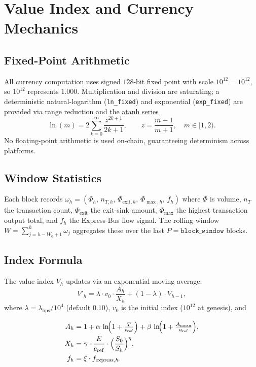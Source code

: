 \documentclass[11pt,a4paper]{article}
\theoremstyle{definition}
\newcommand{\FP}{10^{12}}
\newcommand{\bps}{\mathrm{bps}}
\begin{document}
\section{Value Index and Currency Mechanics}
\label{sec:value-index}

\subsection{Fixed-Point Arithmetic}

All currency computation uses signed $128$-bit fixed point with scale
$\FP = 10^{12}$, so $\FP$ represents $1.000$.  Multiplication and division are
saturating; a deterministic natural-logarithm (\texttt{ln\_fixed}) and
exponential (\texttt{exp\_fixed}) are provided via range reduction and the
\href{https://en.wikipedia.org/wiki/Rapidly_convergent_statements_for_ln}{atanh series}
\[
\ln(m) = 2\sum_{k=0}^{\infty} \frac{z^{2k+1}}{2k+1},\qquad z=\frac{m-1}{m+1},\quad m\in[1,2).
\]
No floating-point arithmetic is used on-chain, guaranteeing determinism across
platforms.

\subsection{Window Statistics}

Each block records $\omega_h = (\Phi_h,\, n_{T,h},\, \Phi_{\mathrm{exit},h},\,
\Phi_{\max,h},\, f_h)$ where $\Phi$ is volume, $n_T$ the transaction count,
$\Phi_{\mathrm{exit}}$ the exit-sink amount, $\Phi_{\max}$ the highest
transaction output total, and $f_h$ the Express-Bus flow signal.  The rolling
window $W = \sum_{j=h-W_0+1}^{h} \omega_j$ aggregates these over the last
$P = \texttt{block\_window}$ blocks.

\subsection{Index Formula}
\label{sec:value-formula}

The value index $V_h$ updates via an exponential moving average:
\[
V'_h = \lambda\cdot v_0 \cdot \frac{A_h}{X_h} + (1-\lambda)\cdot V_{h-1},
\]
where $\lambda = \lambda_{\bps}/10^{4}$ (default $0.10$), $v_0$ is the initial
index ($\FP$ at genesis), and

\begin{align}
A_h &= 1 + \alpha\,\ln\!\Bigl(1+\tfrac{T}{t_{\mathrm{ref}}}\Bigr)
        + \beta\,\ln\!\Bigl(1+\tfrac{A_{\mathrm{mean}}}{a_{\mathrm{ref}}}\Bigr),
\\
X_h &= \gamma\cdot\frac{E}{e_{\mathrm{ref}}}\cdot\Bigl(\frac{S_0}{S_h}\Bigr)^{\eta},
\\
f_h &= \xi\cdot f_{\mathrm{express},h}.
\end{align}
\end{document}
